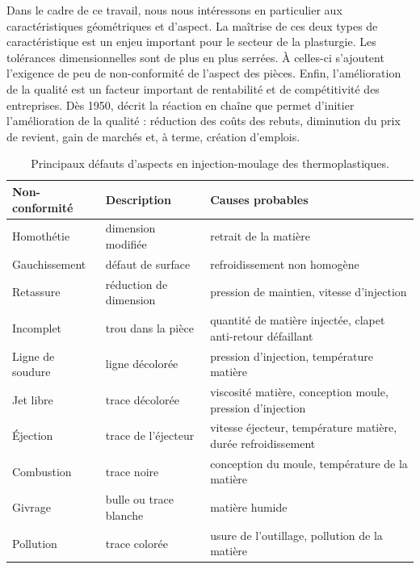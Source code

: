 
Dans le cadre de ce travail, nous nous intéressons en particulier aux caractéristiques géométriques et d'aspect.
La maîtrise de ces deux types de caractéristique est un enjeu important pour le secteur de la plasturgie.
Les tolérances dimensionnelles sont de plus en plus serrées.
À celles-ci s'ajoutent l'exigence de peu de non-conformité de l'aspect des pièces.
Enfin, l'amélioration de la qualité est un facteur important de rentabilité et de compétitivité des entreprises.
Dès 1950, \citeauthor{deming_quality_1982} \cite{deming_quality_1982} décrit la réaction en chaîne que permet d'initier l'amélioration de la qualité : réduction des coûts des rebuts, diminution du prix de revient, gain de marchés et, à terme, création d'emplois.

\begin{table}[htbp]
	\hspace*{-3mm}
	\begin{tabular}{|l|l|l|}
		\arrayrulecolor{black}
		\hline
		Non-conformité & Description & Causes probables \\ \hline \hline
		Homothétie & dimension modifiée & retrait de la matière \\ \hline
		Gauchissement & défaut de surface & refroidissement non homogène \\ \hline
		Retassure  & réduction de dimension & pression de maintien, vitesse d'injection \\ \hline
		Incomplet & trou dans la pièce & quantité de matière injectée, clapet anti-retour défaillant \\ \hline
		Ligne de soudure & ligne décolorée &  pression d'injection, température matière \\ \hline
		Jet libre & trace décolorée & viscosité matière, conception moule, pression d'injection \\ \hline
		Éjection & trace de l'éjecteur & vitesse éjecteur, température matière, durée refroidissement \\ \hline \hline
		Combustion & trace noire & conception du moule, température de la matière \\ \hline
		Givrage & bulle ou trace blanche & matière humide \\ \hline
		Pollution & trace colorée & usure de l'outillage, pollution de la matière \\ \hline
	\end{tabular}
	\caption{Principaux défauts d'aspects en injection-moulage des thermoplastiques.}
	\label{tab:visual_defect}
\end{table}

